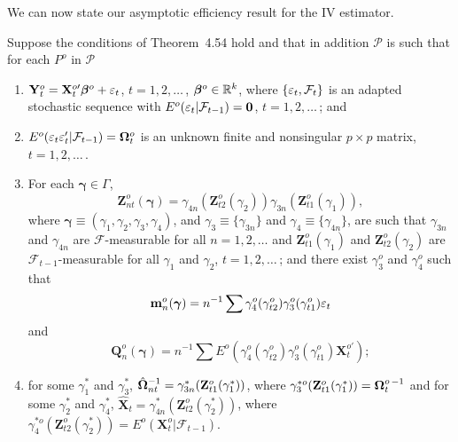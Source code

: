 We can now state our asymptotic efficiency result for the IV estimator.

\begin{theorem}[Efficient IV]\label{thm:4.62}
Suppose the conditions of Theorem~4.54 hold and that in addition $\mathcal{P}$ is such that for each $P^o$ in $\mathcal{P}$
\begin{enumerate}[label=(\roman*)]
\item $\mathbf{Y}_t^o = \mathbf{X}_t^{o\prime}\boldsymbol{\beta}^o + \varepsilon_t$, \quad $t = 1, 2, \ldots$\,, $\boldsymbol{\beta}^o \in \mathbb{R}^k$,
where $\{\varepsilon_t, \mathcal{F}_t\}$ is an adapted stochastic sequence with $E^o(\varepsilon_t|\mathcal{F}_{t-1}) = \mathbf{0}$, $t = 1, 2, \ldots$\,; and
\item $E^o(\varepsilon_t\varepsilon_t'|\mathcal{F}_{t-1}) = \boldsymbol{\Omega}_t^o$ is an unknown finite and nonsingular $p \times p$ matrix, $t = 1, 2, \ldots$\,.
\item For each $\boldsymbol{\gamma} \in \Gamma$,
\[
\mathbf{Z}_{nt}^o(\boldsymbol{\gamma}) = \gamma_{4n}(\mathbf{Z}_{t2}^o(\gamma_2))\gamma_{3n}(\mathbf{Z}_{t1}^o(\gamma_1)),
\]
where $\boldsymbol{\gamma} \equiv (\gamma_1, \gamma_2, \gamma_3, \gamma_4)$, and $\gamma_3 \equiv \{\gamma_{3n}\}$ and $\gamma_4 \equiv \{\gamma_{4n}\}$, are such
that $\gamma_{3n}$ and $\gamma_{4n}$ are $\mathcal{F}$-measurable for all $n = 1, 2, \ldots$ and $\mathbf{Z}_{t1}^o(\gamma_1)$
and $\mathbf{Z}_{t2}^o(\gamma_2)$ are $\mathcal{F}_{t-1}$-measurable for all $\gamma_1$ and $\gamma_2$, $t = 1, 2, \ldots$\,; and
there exist $\gamma_3^o$ and $\gamma_4^o$ such that
\[
\mathbf{m}_n^o(\boldsymbol{\gamma}) = n^{-1}\sum \gamma_4^o(\gamma_{t2}^o)\gamma_3^o(\gamma_{t1}^o)\varepsilon_t
\]
and
\[
\mathbf{Q}_n^o(\boldsymbol{\gamma}) = n^{-1}\sum E^o(\gamma_4^o(\gamma_{t2}^o)\gamma_3^o(\gamma_{t1}^o)\mathbf{X}_t^{o\prime});
\]
\item for some $\gamma_1^*$ and $\gamma_3^*$, $\hat{\boldsymbol{\Omega}}_{nt}^{-1} = \gamma_{3n}^*(\mathbf{Z}_{t1}^o(\gamma_1^*))$, where $\gamma_3^{*o}(\mathbf{Z}_{t1}^o(\gamma_1^*)) = \boldsymbol{\Omega}_t^{o\,-1}$ and for some $\gamma_2^*$ and $\gamma_4^*$, $\hat{\mathbf{X}}_t = \gamma_{4n}^*(\mathbf{Z}_{t2}^o(\gamma_2^*))$, where $\gamma_4^{*o}(\mathbf{Z}_{t2}^o(\gamma_2^*)) = E^o(\mathbf{X}_t^o|\mathcal{F}_{t-1})$.
\end{enumerate}


\end{theorem}
